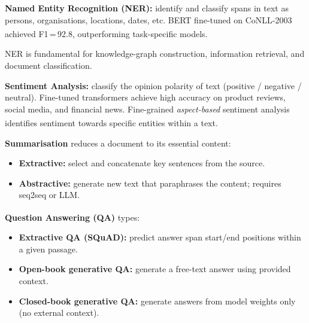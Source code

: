 \begin{tcbitemize}[ skin=sectionraster ]

    \tcbitem[title={Named Entity Recognition and Sentiment Analysis}, raster multicolumn=3]
    \textbf{Named Entity Recognition (NER):} identify and classify spans in text as
    persons, organisations, locations, dates, etc. BERT fine-tuned on CoNLL-2003 achieved
    F1\,=\,92.8, outperforming task-specific
    models.\textsuperscript{\cite[][p.~6]{devlinBERTPretrainingDeep2019}}

    NER is fundamental for knowledge-graph construction, information retrieval, and
    document classification.

    \textbf{Sentiment Analysis:} classify the opinion polarity of text (positive /
    negative / neutral). Fine-tuned transformers achieve high accuracy on product
    reviews, social media, and financial news. Fine-grained \emph{aspect-based} sentiment
    analysis identifies sentiment towards specific entities within a
    text.\textsuperscript{\cite[][p.~12]{dhamaniIntroductionGenerativeAI2024}}

    \tcbitem[title={Text Summarisation and Question Answering}, raster multicolumn=3]
    \textbf{Summarisation} reduces a document to its essential content:
    \begin{itemize}
        \item \textbf{Extractive:} select and concatenate key sentences from the source.
        \item \textbf{Abstractive:} generate new text that paraphrases the content;
              requires seq2seq or LLM.
    \end{itemize}

    \textbf{Question Answering (QA)}
    types:\textsuperscript{\cite[][p.~13]{dhamaniIntroductionGenerativeAI2024}}
    \begin{itemize}
        \item \textbf{Extractive QA (SQuAD):} predict answer span start/end positions
              within a given passage.
        \item \textbf{Open-book generative QA:} generate a free-text answer using
              provided context.
        \item \textbf{Closed-book generative QA:} generate answers from model weights
              only (no external context).
    \end{itemize}

\end{tcbitemize}

